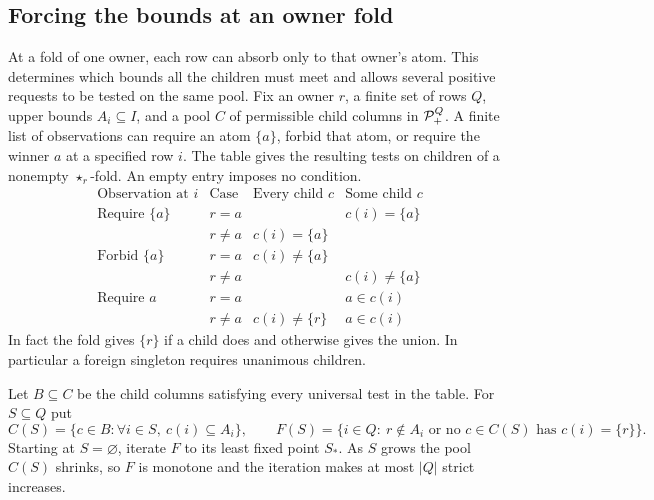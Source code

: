 \subsection{Forcing the bounds at an owner fold}
\label{app:core-owner-folds}

At a fold of one owner, each row can absorb only to that owner's atom.
This determines which bounds all the children must meet and allows
several positive requests to be tested on the same pool.
Fix an owner $r$, a finite set of rows $Q$, upper bounds $A_i\subseteq I$,
and a pool $C$ of permissible child columns in $\mathcal P_+^Q$. A finite list
of observations can require an atom $\{a\}$, forbid that atom, or require
the winner $a$ at a specified row $i$. The table gives the resulting
tests on children of a nonempty $\star_r$-fold. An empty entry imposes
no condition.
\[
\begin{array}{ccll}
\text{Observation at }i & \text{Case}& \text{Every child }c & \text{Some child }c \\
\hline
\text{Require }\{a\} & r=a & & c(i)=\{a\} \\
 & r\ne a & c(i)=\{a\} & \\
\text{Forbid }\{a\} & r=a & c(i)\ne\{a\} & \\
 & r\ne a & & c(i)\ne\{a\} \\
\text{Require }a & r=a & & a\in c(i) \\
 & r\ne a & c(i)\ne\{r\} & a\in c(i)
\end{array}
\]
In fact the fold gives $\{r\}$ if a child does and otherwise gives the
union. In particular a foreign singleton requires unanimous children.

Let $B\subseteq C$ be the child columns satisfying every universal
test in the table. For $S\subseteq Q$ put
\[
 C(S)=\{c\in B:\forall i\in S,\ c(i)\subseteq A_i\},\qquad
 F(S)=\{i\in Q:\ r\notin A_i\text{ or no }c\in C(S)
                              \text{ has }c(i)=\{r\}\}.
\]
Starting at $S=\varnothing$, iterate $F$ to its least fixed point $S_*$.
As $S$ grows the pool $C(S)$ shrinks, so $F$ is monotone and the
iteration makes at most $|Q|$ strict increases.

